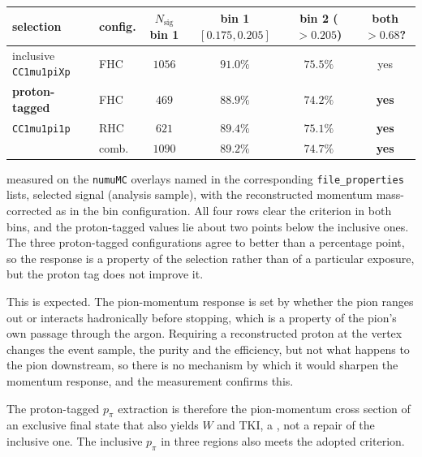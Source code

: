 \documentclass[11pt,a4paper]{article}
\begin{document}
\begin{center}\small
\begin{tabular}{llccc c}
\toprule
selection & config. & $N_\mathrm{sig}$ bin 1 & bin 1 $[0.175,0.205]$
 & bin 2 ($>0.205$) & both $>0.68$? \\\midrule
inclusive \texttt{CC1mu1piXp} & FHC & $1056$ & $91.0\%$ & $75.5\%$ & yes \\\midrule
\textbf{proton-tagged} & FHC & $469$ & $\mathbf{88.9\%}$ & $\mathbf{74.2\%}$ & \textbf{yes} \\
\texttt{CC1mu1pi1p} & RHC & $621$ & $\mathbf{89.4\%}$ & $\mathbf{75.1\%}$ & \textbf{yes} \\
 & comb. & $1090$ & $\mathbf{89.2\%}$ & $\mathbf{74.7\%}$ & \textbf{yes} \\
\bottomrule
\end{tabular}
\end{center}

\noindent measured on the \texttt{numuMC} overlays named in the corresponding
\texttt{file\_properties} lists, selected signal (analysis sample), with the reconstructed momentum
mass-corrected as in the bin configuration. All four rows clear the criterion in both
bins, and the proton-tagged values lie about two points below the inclusive ones.
The three proton-tagged configurations agree to better than a
percentage point, so the response is a property of the selection rather than of a particular
exposure, but the proton tag does not improve it.

This is expected. The pion-momentum response is set by whether the pion ranges out or
interacts hadronically before stopping, which is a property of the pion's own passage through
the argon. Requiring a reconstructed proton at the vertex changes the event sample, the purity
and the efficiency, but not what happens to the pion downstream, so there is
no mechanism by which it would sharpen the momentum response, and the measurement confirms
this.

The proton-tagged $p_\pi$ extraction is therefore the pion-momentum cross section of an
exclusive final state that also yields $W$ and TKI, a \statValidation{},
not a repair of the inclusive one. The inclusive $p_\pi$ in three regions also meets the
adopted criterion.
\end{document}
